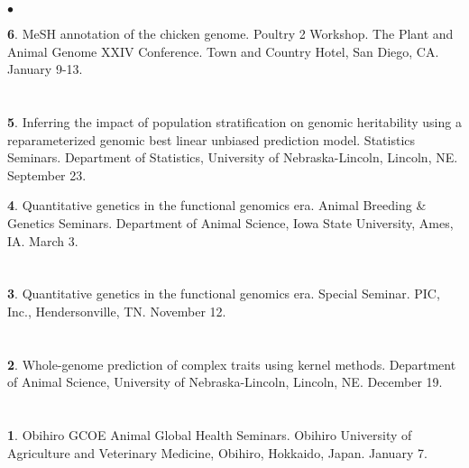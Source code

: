 \documentclass[margin,line,10pt]{res}
\newenvironment{list1}{
  \begin{list}{\ding{113}}{%
      \setlength{\itemsep}{0in}
      \setlength{\parsep}{0in} \setlength{\parskip}{0in}
      \setlength{\topsep}{0in} \setlength{\partopsep}{0in} 
      \setlength{\leftmargin}{0.17in}}}{\end{list}}
\newenvironment{list2}{
  \begin{list}{$\bullet$}{%
      \setlength{\itemsep}{0in}
      \setlength{\parsep}{0in} \setlength{\parskip}{0in}
      \setlength{\topsep}{0in} \setlength{\partopsep}{0in} 
      \setlength{\leftmargin}{0.2in}}}{\end{list}}
\begin{document}
\begin{resume}
\begin{list2}
  \vspace{0.5cm}
  
  \item [{\bf 6}.] MeSH annotation of the chicken genome. Poultry 2 Workshop. The Plant and Animal Genome XXIV Conference. Town and Country Hotel, San Diego, CA. January 9-13. 
  
\end{list2}

\section{}
\begin{list1}
\item [{\bf 5}.] Inferring the impact of population stratification on genomic heritability using a reparameterized genomic best linear unbiased prediction model. Statistics Seminars. Department of Statistics, University of Nebraska-Lincoln, Lincoln, NE. September 23. 

  \vspace{0.5cm}

\item [{\bf 4}.] Quantitative genetics in the functional genomics era. Animal Breeding \& Genetics Seminars. Department of Animal Science, Iowa State University, Ames, IA. March 3. 
\end{list1}

\section{}
\begin{list1}
\item [{\bf 3}.] Quantitative genetics in the functional genomics era. Special Seminar. PIC, Inc., Hendersonville, TN.  November 12. 
\end{list1}

\section{}
\begin{list1}
\item [{\bf 2}.] Whole-genome prediction of complex traits using kernel methods. Department of Animal Science, University of Nebraska-Lincoln, Lincoln, NE. December 19. 
\end{list1}

\section{}
\begin{list1}
\item [{\bf 1}.] Obihiro GCOE Animal Global Health Seminars.  Obihiro University of Agriculture and  Veterinary Medicine, Obihiro, Hokkaido, Japan. January 7. 
\end{list1}  




\end{resume}
\end{document}

